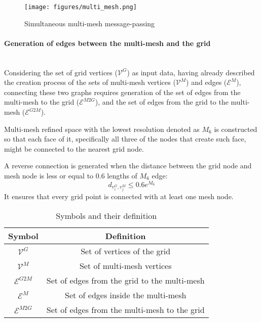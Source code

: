 \begin{figure}[!ht]
    \centering
    \texttt{[image: figures/multi\_mesh.png]}
    \caption{Simultaneous multi-mesh message-passing \cite{lam2023graphcast}}
    \label{fig:multi-mesh}
\end{figure}


\paragraph{Generation of edges between the multi-mesh and the grid} \mbox{} \\
\noindent Considering the set of grid vertices ($\mathcal{V}^{G}$) as input data, having already described the creation process of the sets of multi-mesh vertices ($\mathcal{V}^{M}$) and edges ($\mathcal{E}^{M}$), connecting these two graphs requires generation of the set of edges from the multi-mesh to the grid ($\mathcal{E}^{M2G}$), and the set of edges from the grid to the multi-mesh ($\mathcal{E}^{G2M}$).

Multi-mesh refined space with the lowest resolution denoted as $M_6$ is constructed so that each face of it, specifically all three of the nodes that create such face, might be connected to the nearest grid node.

A reverse connection is generated when the distance between the grid node and mesh node is less or equal to 0.6 lengths of $M_6$ edge:
\[
    d_{v_i^G,v_j^M} \leq 0.6e^{M_6}
\]
It ensures that every grid point is connected with at least one mesh node.

\begin{table}[!ht]
    \centering
    \begin{tabular}{|c|c|}
        \hline
        Symbol & Definition \\
        \hline
        $\mathcal{V}^{G}$ & Set of vertices of the grid \\
        $\mathcal{V}^M$ & Set of multi-mesh vertices \\
        $\mathcal{E}^{G2M}$ & Set of edges from the grid to the multi-mesh \\
        $\mathcal{E}^{M}$ & Set of edges inside the multi-mesh \\
        $\mathcal{E}^{M2G}$ & Set of edges from the multi-mesh to the grid \\
        \hline 
    \end{tabular}
    \caption{Symbols and their definition}
    \label{tab:graphcast-symbols}
\end{table}

